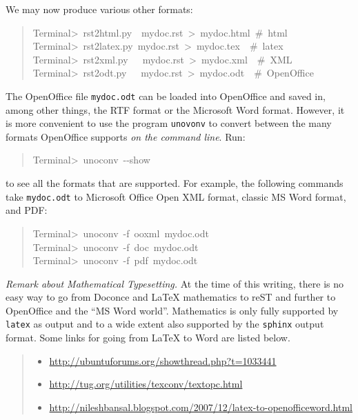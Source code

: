 \documentclass[a4paper]{article}
\begin{document}
We may now produce various other formats:
%
\begin{quote}{\ttfamily \raggedright \noindent
Terminal>~rst2html.py~~mydoc.rst~>~mydoc.html~\#~html\\
Terminal>~rst2latex.py~mydoc.rst~>~mydoc.tex~~\#~latex\\
Terminal>~rst2xml.py~~~mydoc.rst~>~mydoc.xml~~\#~XML\\
Terminal>~rst2odt.py~~~mydoc.rst~>~mydoc.odt~~\#~OpenOffice
}
\end{quote}

The OpenOffice file \texttt{mydoc.odt} can be loaded into OpenOffice and
saved in, among other things, the RTF format or the Microsoft Word format.
However, it is more convenient to use the program \texttt{unovonv}
to convert between the many formats OpenOffice supports \emph{on the command line}.
Run:
%
\begin{quote}{\ttfamily \raggedright \noindent
Terminal>~unoconv~-{}-show
}
\end{quote}

to see all the formats that are supported.
For example, the following commands take
\texttt{mydoc.odt} to Microsoft Office Open XML format,
classic MS Word format, and PDF:
%
\begin{quote}{\ttfamily \raggedright \noindent
Terminal>~unoconv~-f~ooxml~mydoc.odt\\
Terminal>~unoconv~-f~doc~mydoc.odt\\
Terminal>~unoconv~-f~pdf~mydoc.odt
}
\end{quote}

\emph{Remark about Mathematical Typesetting.} At the time of this writing, there is no easy way to go from Doconce
and LaTeX mathematics to reST and further to OpenOffice and the
``MS Word world''. Mathematics is only fully supported by \texttt{latex} as
output and to a wide extent also supported by the \texttt{sphinx} output format.
Some links for going from LaTeX to Word are listed below.
%
\begin{quote}
%
\begin{itemize}

\item \url{http://ubuntuforums.org/showthread.php?t=1033441}

\item \url{http://tug.org/utilities/texconv/textopc.html}

\item \url{http://nileshbansal.blogspot.com/2007/12/latex-to-openofficeword.html}

\end{itemize}

\end{quote}
\end{document}
